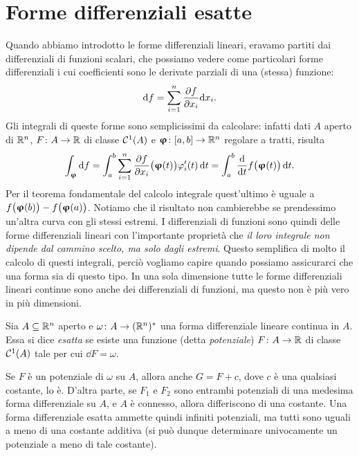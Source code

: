 \section{Forme differenziali esatte}
Quando abbiamo introdotto le forme differenziali lineari, eravamo partiti dai differenziali di funzioni scalari, che possiamo vedere come particolari forme differenziali i cui coefficienti sono le derivate parziali di una (stessa) funzione:
\begin{equation}
	\textup{d} f=\sum_{i=1}^n\frac{\partial {f}}{\partial {x_i}}\textup{d} x_i.
\end{equation}
Gli integrali di queste forme sono semplicissimi da calcolare: infatti dati $A$ aperto di $\mathbb{R}^n$, $F\colon A\to\mathbb{R}$ di classe $\mathcal{C}^{{1}}(A)$ e $\bm{\upvarphi}\colon[a,b]\to\mathbb{R}^n$ regolare a tratti, risulta
\begin{equation}
	\int_{\bm{\upvarphi}}\textup{d} f=\int_a^b\sum_{i=1}^n\frac{\partial {f}}{\partial {x_i}}\big(\bm{\upvarphi}(t)\big)\varphi_i'(t)\,\textup{d} t=\int_a^b\frac{\textup{d} {}}{\textup{d} {t}}f\big(\bm{\upvarphi}(t)\big)\,\textup{d} t.
\end{equation}
Per il teorema fondamentale del calcolo integrale quest'ultimo è uguale a $f\big(\bm{\upvarphi}(b)\big)-f\big(\bm{\upvarphi}(a)\big)$.
Notiamo che il risultato non cambierebbe se prendessimo un'altra curva con gli stessi estremi.
I differenziali di funzioni sono quindi delle forme differenziali lineari con l'importante proprietà che \emph{il loro integrale non dipende dal cammino scelto, ma solo dagli estremi}.
Questo semplifica di molto il calcolo di questi integrali, perciò vogliamo capire quando possiamo assicurarci che una forma sia di questo tipo.
In una sola dimensione tutte le forme differenziali lineari continue sono anche dei differenziali di funzioni, ma questo non è più vero in più dimensioni.
\begin{definizione} \label{d:forma-differenziale-esatta}
	Sia $A\subseteq\mathbb{R}^n$ aperto e $\omega\colon A\to(\mathbb{R}^n)^*$ una forma differenziale lineare continua in $A$.
	Essa si dice \emph{esatta} se esiste una funzione (detta \emph{potenziale}) $F\colon A\to\mathbb{R}$ di classe $\mathcal{C}^{{1}}(A)$ tale per cui $\dd F=\omega$.
\end{definizione}
\begin{osservazione}
	Se $F$ è un potenziale di $\omega$ su $A$, allora anche $G=F+c$, dove $c$ è una qualsiasi costante, lo è.
	D'altra parte, se $F_1$ e $F_2$ sono entrambi potenziali di una medesima forma differenziale su $A$, e $A$ è connesso, allora differiscono di una costante. %
	Una forma differenziale esatta ammette quindi infiniti potenziali, ma tutti sono uguali a meno di una costante additiva (si può dunque determinare univocamente un potenziale a meno di tale costante).
\end{osservazione}
